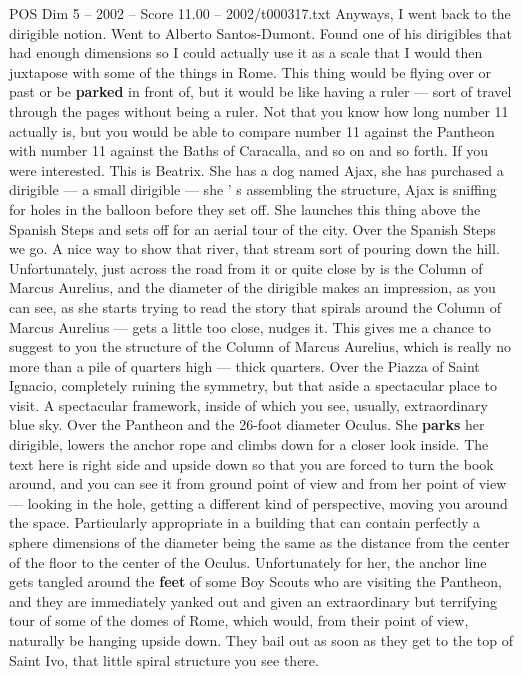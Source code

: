 \begin{textsample}{POS Dim 5 – 2002 – Score 11.00 – 2002/t000317.txt}
Anyways, I went back to the dirigible notion.
Went to Alberto Santos-Dumont.
Found one of his dirigibles that had enough dimensions so I could actually use it as a scale that I would then juxtapose with some of the things in Rome.
This thing would be flying over or past or be \textbf{parked} in front of, but it would be like having a ruler — sort of travel through the pages without being a ruler.
Not that you know how long number 11 actually is, but you would be able to compare number 11 against the Pantheon with number 11 against the Baths of Caracalla, and so on and so forth.
If you were interested.
This is Beatrix.
She has a dog named Ajax, she has purchased a dirigible — a small dirigible — she ' s assembling the structure, Ajax is sniffing for holes in the balloon before they set off.
She launches this thing above the Spanish Steps and sets off for an aerial tour of the city.
Over the Spanish Steps we go.
A nice way to show that river, that stream sort of pouring down the hill.
Unfortunately, just across the road from it or quite close by is the Column of Marcus Aurelius, and the diameter of the dirigible makes an impression, as you can see, as she starts trying to read the story that spirals around the Column of Marcus Aurelius — gets a little too close, nudges it.
This gives me a chance to suggest to you the structure of the Column of Marcus Aurelius, which is really no more than a pile of quarters high — thick quarters.
Over the Piazza of Saint Ignacio, completely ruining the symmetry, but that aside a spectacular place to visit.
A spectacular framework, inside of which you see, usually, extraordinary blue sky.
Over the Pantheon and the 26-foot diameter Oculus.
She \textbf{parks} her dirigible, lowers the anchor rope and climbs down for a closer look inside.
The text here is right side and upside down so that you are forced to turn the book around, and you can see it from ground point of view and from her point of view — looking in the hole, getting a different kind of perspective, moving you around the space.
Particularly appropriate in a building that can contain perfectly a sphere dimensions of the diameter being the same as the distance from the center of the floor to the center of the Oculus.
Unfortunately for her, the anchor line gets tangled around the \textbf{feet} of some Boy Scouts who are visiting the Pantheon, and they are immediately yanked out and given an extraordinary but terrifying tour of some of the domes of Rome, which would, from their point of view, naturally be hanging upside down.
They bail out as soon as they get to the top of Saint Ivo, that little spiral structure you see there.

\end{textsample}
